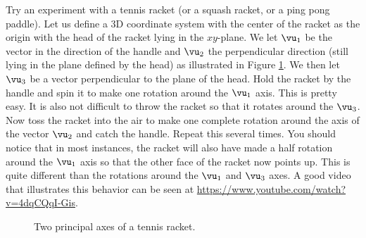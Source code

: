 \label{chap:principal_axis_theorem}

\vspace*{-17 pt}

\vspace*{3 pt}

\label{sec:appl_tennis}

Try an experiment with a tennis racket (or a squash racket, or a ping pong paddle). Let us define a 3D coordinate system with the center of the racket as the origin with the head of the racket lying in the $xy$-plane. We let $\vu_1$ be the vector in the direction of the handle and $\vu_2$ the perpendicular direction (still lying in the plane defined by the head) as illustrated in Figure \ref{F:tennis_racket}. We then let $\vu_3$ be a vector perpendicular to the plane of the head. Hold the racket by the handle and spin it to make one rotation around the $\vu_1$ axis. This is pretty easy. It is also not difficult to throw the racket so that it rotates around the $\vu_3$. Now toss the racket into the air to make one complete rotation around the axis of the vector $\vu_2$ and catch the handle. Repeat this several times. You should notice that in most instances, the racket will also have made a half rotation around the $\vu_1$ axis so that the other face of the racket now points up. This is quite different than the rotations around the $\vu_1$ and $\vu_3$ axes. A good video that illustrates this behavior can be seen at \url{https://www.youtube.com/watch?v=4dqCQqI-Gis}. 

\begin{figure}[ht]
  \begin{center}
    \caption{Two principal axes of a tennis racket.}
    \label{F:tennis_racket}
  \end{center}
\end{figure}


